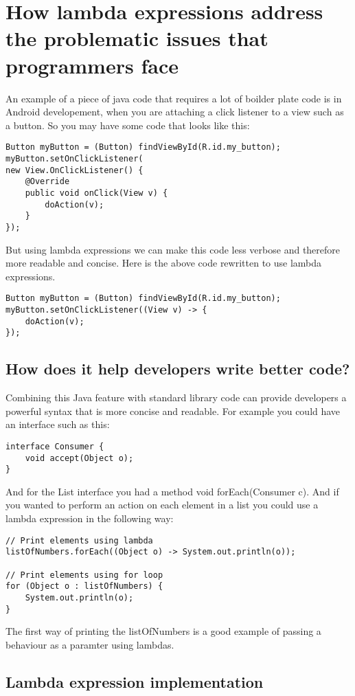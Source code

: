 \documentclass[twocolumn,notitlepage]{report}
\begin{document}
\section*{How lambda expressions address the problematic issues that programmers face}
An example of a piece of java code that requires a lot of boilder plate code is
in Android developement, when you are attaching a click listener to a view such
as a button. So you may have some code that looks like this:
\begin{lstlisting}
Button myButton = (Button) findViewById(R.id.my_button);
myButton.setOnClickListener(
new View.OnClickListener() {
	@Override
	public void onClick(View v) {
		doAction(v);
	}
});
\end{lstlisting}
But using lambda expressions we can make this code less verbose and therefore
more readable and concise. Here is the above code rewritten to use lambda
expressions.
\newpage
\begin{lstlisting}
Button myButton = (Button) findViewById(R.id.my_button);
myButton.setOnClickListener((View v) -> {
	doAction(v);
});
\end{lstlisting}

\subsection*{How does it help developers write better code?}
Combining this Java feature with standard library code can provide developers a powerful syntax 
that is more concise and readable. For example you could have an interface such as this:
\begin{lstlisting}
interface Consumer {
	void accept(Object o);
}
\end{lstlisting}
And for the {\ttfamily List} interface you had a method {\ttfamily void
forEach(Consumer c)}.  And if you wanted to perform an action on each element
in a list you could use a lambda expression in the following way:
\begin{lstlisting}
// Print elements using lambda
listOfNumbers.forEach((Object o) -> System.out.println(o));

// Print elements using for loop
for (Object o : listOfNumbers) {
	System.out.println(o);
}
\end{lstlisting}
The first way of printing the listOfNumbers is a good example of passing a
behaviour as a paramter using lambdas.
\cite{website:why-we-need-lambda-expressions-in-java}


\subsection*{Lambda expression implementation}
\end{document}
